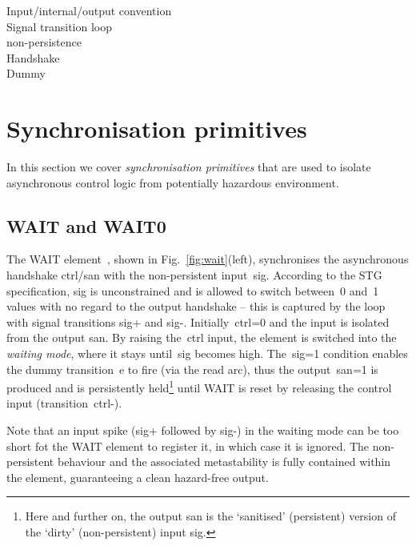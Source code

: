 \documentclass[conference]{IEEEtran}
\begin{document}
Input/internal/output convention\\

Signal transition loop\\

non-persistence\\

Handshake\\

Dummy\\

\section{Synchronisation primitives}

In this section we cover \emph{synchronisation primitives} that are used to
isolate asynchronous control logic from potentially hazardous environment.

\subsection{\textsf{WAIT} and \textsf{WAIT0}}

The \textsf{WAIT} element~\cite{2015_sokolov_multiphase}, shown in Fig.~\ref{fig:wait}(left),
synchronises the asynchronous handshake \textsf{ctrl/san} with the non-persistent
input~\textsf{sig}. According to the STG specification, \textsf{sig} is unconstrained and
is allowed to switch between~0 and~1 values with no regard to the output handshake -- this
is captured by the loop with signal transitions \textsf{sig+} and \textsf{sig-}.
Initially~\textsf{ctrl=0} and the input is isolated from the output \textsf{san}.
By raising the~\textsf{ctrl} input, the element is switched into the \emph{waiting mode},
where it stays until~\textsf{sig} becomes high. The~\textsf{sig=1} condition enables the dummy
transition~\textsf{e} to fire (via the read arc), thus the output~\textsf{san=1} is produced
and is persistently held\footnote{Here and further on, the output \textsf{san}
is the `sanitised' (persistent) version of the `dirty' (non-persistent) input \textsf{sig}.}
until \textsf{WAIT} is reset by releasing the control input (transition~\textsf{ctrl-}).

Note that an input spike (\textsf{sig+} followed by \textsf{sig-}) in the waiting
mode can be too short fot the \textsf{WAIT} element to register it, in which case it is
ignored. The non-persistent behaviour and the associated metastability is fully contained
within the element, guaranteeing a clean hazard-free output.
\end{document}
